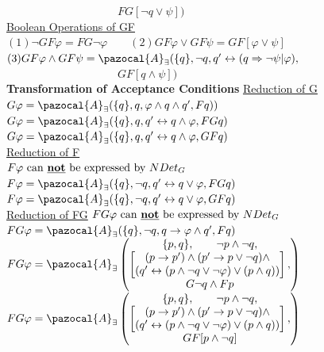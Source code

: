 \documentclass{article}
\newcommand{\Ab}{\pazocal{A}}
\begin{document}
\begin{multicols}{4}
$\qquad\qquad\qquad\qquad\qquad FG[\neg q \vee \psi])$\\
\underline{Boolean Operations of GF}
$(1)\neg GF \varphi = FG \neg \varphi \qquad(2)GF \varphi \vee GF \psi = GF[\varphi \vee \psi]$\\
$(3) GF \varphi \wedge GF \psi = \Ab_{\exists}(\{q\}, \neg q, q' \leftrightarrow (q \Rightarrow \neg \psi | \varphi),$\\
$\qquad\qquad\qquad\qquad\qquad GF[q \wedge \psi])$\\
\textbf{Transformation of Acceptance Conditions}
\underline{Reduction of G}\\
$G\varphi = \Ab_{\exists}(\{q\},q,\varphi \wedge q \wedge q',F q))$\\
$G\varphi = \Ab_{\exists}(\{q\},q, q' \leftrightarrow q \wedge \varphi,FG q)$\\
$G\varphi = \Ab_{\exists}(\{q\},q, q' \leftrightarrow q \wedge \varphi,GF q)$\\ 
\underline{Reduction of F}\\
$F\varphi \text{ can \textbf{\underline{not}} be expressed by } NDet_G$\\
$F\varphi = \Ab_{\exists}(\{q\},\neg q, q' \leftrightarrow q \vee \varphi,FG q)$ \\
$F\varphi = \Ab_{\exists}(\{q\},\neg q, q' \leftrightarrow q \vee \varphi,GF q)$\\
\underline{Reduction of FG}
$FG\varphi \text{ can \textbf{\underline{not}} be expressed by } NDet_G$\\
$FG\varphi = \Ab_{\exists}(\{q\},\neg q, q \rightarrow \varphi \wedge q',F q)$\\
$FG\varphi = \Ab_{\exists} \begin{pmatrix}
\{p,q\},\qquad \neg p \wedge \neg q,\\
	\begin{bmatrix}
(p \rightarrow p') \wedge (p' \rightarrow p \vee \neg q) \wedge \\
(q' \leftrightarrow (p \wedge \neg q \vee \neg \varphi) \vee (p \wedge q))
    \end{bmatrix},\\
    G \neg q \wedge F p
\end{pmatrix}$\\
$FG\varphi = \Ab_{\exists} \begin{pmatrix}
\{p,q\},\qquad \neg p \wedge \neg q,\\
	\begin{bmatrix}
(p \rightarrow p') \wedge (p' \rightarrow p \vee \neg q) \wedge \\
(q' \leftrightarrow (p \wedge \neg q \vee \neg \varphi) \vee (p \wedge q))
    \end{bmatrix},\\
    GF[p \wedge \neg q]
\end{pmatrix}$


\end{multicols}
\end{document}
